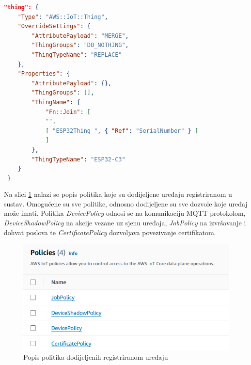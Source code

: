 \begin{lstlisting}[caption={Odjeljak \textit{stvar} u predlošku za registraciju}, language=json]
 "thing": {
	"Type": "AWS::IoT::Thing",
	"OverrideSettings": {
		"AttributePayload": "MERGE",
		"ThingGroups": "DO_NOTHING",
		"ThingTypeName": "REPLACE"
	},
	"Properties": {
		"AttributePayload": {},
		"ThingGroups": [],
		"ThingName": {
			"Fn::Join": [
			"",
			[ "ESP32Thing_", { "Ref": "SerialNumber" } ]
			]
		},
		"ThingTypeName": "ESP32-C3"
	}
 }
\end{lstlisting}

Na slici \ref{fig:policies} nalazi se popis politika koje su dodijeljene uređaju registriranom u sustav. Omogućene su sve politike, odnosno dodijeljene su sve dozvole koje uređaj može imati. Politika \textit{DevicePolicy} odnosi se na komunikaciju MQTT protokolom, \textit{DeviceShadowPolicy} na akcije vezane uz sjenu uređaja, \textit{JobPolicy} na izvršavanje i dohvat poslova te \textit{CertificatePolicy} dozvoljava povezivanje certifikatom. 

\begin{figure}[ht]
	\centering
	\includegraphics[scale=0.8]{imgs/policies}
	\caption{Popis politika dodijeljenih registriranom uređaju}
	\label{fig:policies}
\end{figure}

